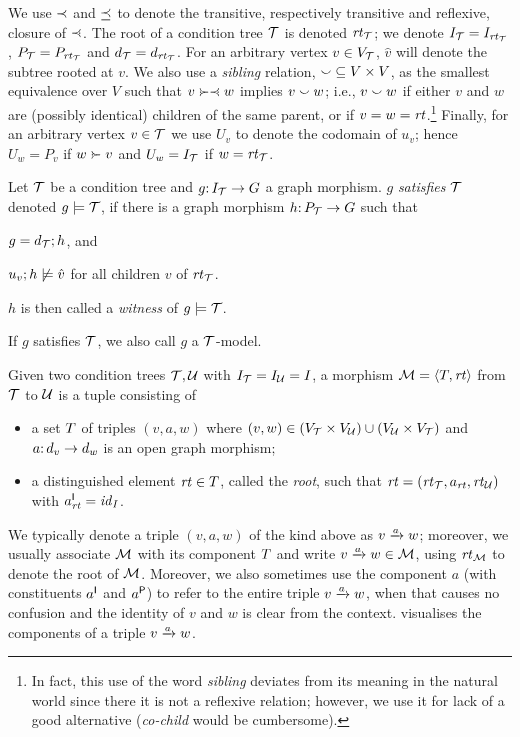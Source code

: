 We use $\ancestof$ and $\ancesteq$ to denote the transitive, respectively transitive and reflexive, closure of $\parentof$. The root of a condition tree $\cT$ is denoted $\rtof\cT$; we denote $I_\cT=I_{\rtof\cT}$, $P_\cT=P_{\rtof\cT}$ and $d_\cT=d_{\rtof\cT}$. For an arbitrary vertex $v\in V_\cT$, $\hat v$ will denote the subtree rooted at $v$. We also use a \emph{sibling} relation, ${\sibling}\subseteq V\times V$, as the smallest equivalence over $V$ such that $v\childof\parentof w$ implies $v\sibling w$; i.e., $v\sibling w$ if either $v$ and $w$ are (possibly identical) children of the same parent, or if $v=w=\rt$.\footnote{In fact, this use of the word \emph{sibling} deviates from its meaning in the natural world since there it is not a reflexive relation; however, we use it for lack of a good alternative (\emph{co-child} would be cumbersome).} Finally, for an arbitrary vertex $v\in \cT$ we use $U_v$ to denote the codomain of $u_v$; hence $U_w=P_v$ if $w\childof v$ and $U_w=I_\cT$ if $w=\rtof\cT$.

\begin{definition}[satisfaction]\label{def:satisfaction}
Let $\cT$ be a condition tree and $g\of I_\cT\to G$ a graph morphism. $g$ \emph{satisfies $\cT$} denoted $g\sat \cT$, if there is a graph morphism $h\of P_\cT\to G$ such that
\begin{inumerate}
\item $g=d_\cT;h$, and 
\item $u_v;h\nsat \hat v$ for all children $v$ of $\rtof\cT$.
\end{inumerate}
$h$ is then called a \emph{witness} of $g\sat \cT$.
\end{definition}
%
If $g$ satisfies $\cT$, we also call $g$ a $\cT$-model.


\begin{definition}[morphism]\label{def:morphism}
Given two condition trees $\cT,\cU$ with $I_\cT=I_\cU=I$, a morphism $\cM=\tupof{\tp,\rt}$ from $\cT$ to $\cU$ is a tuple consisting of
\begin{itemize}
\item a set $\tp$ of triples $(v,a,w)$ where $(v,w)\in (V_\cT\times V_\cU) \cup (V_\cU\times V_\cT)$ and $a\of d_v\to d_w$ is an open graph morphism;
\item a distinguished element $\rt\in\tp$, called the \emph{root}, such that $\rt=(\rtof\cT,a_{\rt},\rtof\cU)$ with $a_{\rt}\I=\id_I$.
\end{itemize}
\end{definition}
%
We typically denote a triple $(v,a,w)$ of the kind above as $\trip vaw$; moreover, we usually associate $\cM$ with its component $\tp$ and write $\trip vaw\in\cM$, using $\rtof\cM$ to denote the root of $\cM$. Moreover, we also sometimes use the component $a$ (with constituents $a\I$ and $a\P$) to refer to the entire triple $\trip vaw$, when that causes no confusion and the identity of $v$ and $w$ is clear from the context.  visualises the components of a triple $\trip vaw$.

